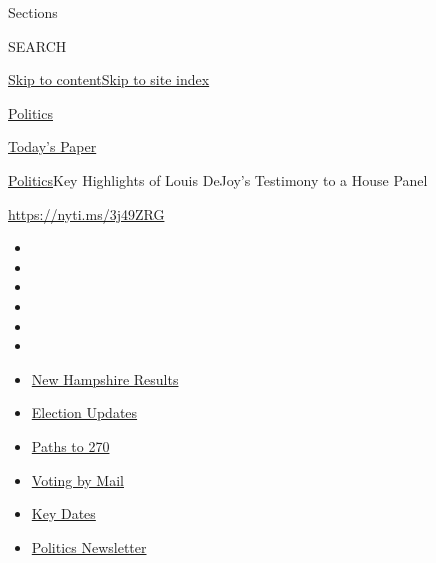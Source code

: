 Sections

SEARCH

\protect\hyperlink{site-content}{Skip to
content}\protect\hyperlink{site-index}{Skip to site index}

\href{https://www.nytimes3xbfgragh.onion/section/politics}{Politics}

\href{https://myaccount.nytimes3xbfgragh.onion/auth/login?response_type=cookie\&client_id=vi}{}

\href{https://www.nytimes3xbfgragh.onion/section/todayspaper}{Today's
Paper}

\href{/section/politics}{Politics}\textbar{}Key Highlights of Louis
DeJoy's Testimony to a House Panel

\url{https://nyti.ms/3j49ZRG}

\begin{itemize}
\item
\item
\item
\item
\item
\item
\end{itemize}

\begin{itemize}
\item
  \href{https://www.nytimes3xbfgragh.onion/interactive/2020/09/08/us/elections/results-new-hampshire-primary-elections.html?action=click\&pgtype=Article\&state=default\&region=TOP_BANNER\&context=storylines_menu}{New
  Hampshire Results}
\item
  \href{https://www.nytimes3xbfgragh.onion/live/2020/09/08/us/trump-vs-biden?action=click\&pgtype=Article\&state=default\&region=TOP_BANNER\&context=storylines_menu}{Election
  Updates}
\item
  \href{https://www.nytimes3xbfgragh.onion/interactive/2020/us/elections/election-states-biden-trump.html?action=click\&pgtype=Article\&state=default\&region=TOP_BANNER\&context=storylines_menu}{Paths
  to 270}
\item
  \href{https://www.nytimes3xbfgragh.onion/interactive/2020/08/31/us/politics/vote-by-mail-deadlines.html?action=click\&pgtype=Article\&state=default\&region=TOP_BANNER\&context=storylines_menu}{Voting
  by Mail}
\item
  \href{https://www.nytimes3xbfgragh.onion/interactive/2019/us/elections/2020-presidential-election-calendar.html?action=click\&pgtype=Article\&state=default\&region=TOP_BANNER\&context=storylines_menu}{Key
  Dates}
\item
  \href{https://www.nytimes3xbfgragh.onion/newsletters/politics?action=click\&pgtype=Article\&state=default\&region=TOP_BANNER\&context=storylines_menu}{Politics
  Newsletter}
\end{itemize}

